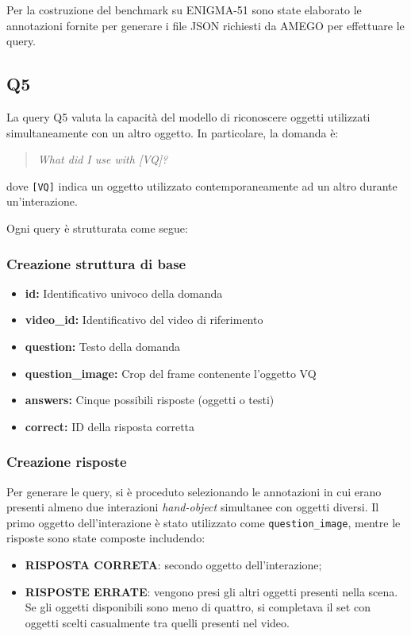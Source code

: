 Per la costruzione del benchmark su ENIGMA-51 sono state elaborato le annotazioni fornite per generare i file JSON richiesti da AMEGO per effettuare le query. 

\subsection*{Q5}

La query Q5 valuta la capacità del modello di riconoscere oggetti utilizzati simultaneamente con un altro oggetto. In particolare, la domanda è:

\begin{quote}
\textit{What did I use with [VQ]?}
\end{quote}

dove \texttt{[VQ]} indica un oggetto utilizzato contemporaneamente ad un altro durante un'interazione.

Ogni query è strutturata come segue:

\subsubsection*{Creazione struttura di base}
\begin{itemize}
    \item \textbf{id:} Identificativo univoco della domanda
    \item \textbf{video\_id:} Identificativo del video di riferimento
    \item \textbf{question:} Testo della domanda
    \item \textbf{question\_image:} Crop del frame contenente l'oggetto VQ
    \item \textbf{answers:} Cinque possibili risposte (oggetti o testi)
    \item \textbf{correct:} ID della risposta corretta
\end{itemize}

\subsubsection*{Creazione risposte}
Per generare le query, si è proceduto selezionando le annotazioni in cui erano presenti almeno due interazioni \emph{hand-object} simultanee con oggetti diversi. Il primo oggetto dell'interazione è stato utilizzato come \texttt{question\_image}, mentre le risposte sono state composte includendo:

\begin{itemize}
    \item \textbf{RISPOSTA CORRETA}: secondo oggetto dell'interazione;
    \item \textbf{RISPOSTE ERRATE}: vengono presi gli altri oggetti presenti nella scena. Se gli oggetti disponibili sono meno di quattro, si completava il set con oggetti scelti casualmente tra quelli presenti nel video.
\end{itemize}

